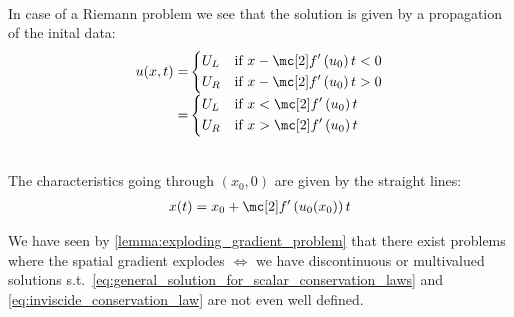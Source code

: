 \begin{corbox}\nospacing
    \begin{cor}
        \label{cor:riemann_problem_solution_and_scalar_conservation_laws}\leavevmode\\
        In case of a Riemann problem we see that the solution is given by a propagation of the inital data:
        \begin{align}
        u(x,t)=&\left\{\begin{aligned}
                &U_{L}&&\text{if }x-\flux'\left(u_{0}\right)t<0\\
                &U_{R}&&\text{if }x-\flux'\left(u_{0}\right)t>0
            \end{aligned}\right.\\[-1\jot]
          =&\left\{\begin{aligned}
                &U_{L}&&\text{if }x<\flux'\left(u_{0}\right)t\\
                &U_{R}&&\text{if }x>\flux'\left(u_{0}\right)t
                \end{aligned}\right.\label{eq:riemann_problem_solution_and_scalar_conservation_laws}
        \end{align}
    \end{cor}
\end{corbox}
\begin{defnbox}\nospacing
    \begin{defn}\label{defn:characteristics_for_sclar_conservation_laws}\leavevmode\\
        The characteristics going through $(x_{0},0)$ are given by the straight lines:
        \begin{align}
          x(t)=x_{0}+\flux'\left(u_{0}(x_{0})\right)t\label{eq:characteristics_for_sclar_conservation_laws}
        \end{align}
    \end{defn}
\end{defnbox}
\begin{sectionbox}[Problem]\nospacing
    We have seen by \cref{lemma:exploding_gradient_problem} that there exist problems where the spatial gradient explodes $\iff$ we
    have discontinuous or multivalued solutions s.t.\ \cref{eq:general_solution_for_scalar_conservation_laws} and \cref{eq:inviscide_conservation_law}
    are not even well defined.
\end{sectionbox}
